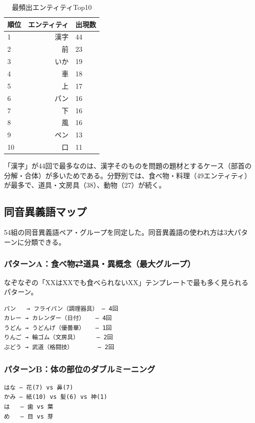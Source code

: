 \documentclass[a4paper,11pt]{ltjsarticle}
\begin{document}
\begin{table}[htbp]
\caption{最頻出エンティティTop10}
\centering
\begin{tabular}{lrl}
\toprule
順位 & エンティティ & 出現数\\
\midrule
1 & 漢字 & 44\\
2 & 前 & 23\\
3 & いか & 19\\
4 & 車 & 18\\
5 & 上 & 17\\
6 & パン & 16\\
7 & 下 & 16\\
8 & 風 & 16\\
9 & ペン & 13\\
10 & 口 & 11\\
\bottomrule
\end{tabular}
\end{table}

「漢字」が44回で最多なのは、漢字そのものを問題の題材とするケース（部首の分解・合体）が多いためである。分野別では、食べ物・料理（49エンティティ）が最多で、道具・文房具（38）、動物（27）が続く。

\subsection{同音異義語マップ}

54組の同音異義語ペア・グループを同定した。同音異義語の使われ方は3大パターンに分類できる。

\subsubsection*{パターンA：食べ物⇄道具・異概念（最大グループ）}

なぞなぞの「XXはXXでも食べられないXX」テンプレートで最も多く見られるパターン。

\begin{Verbatim}[frame=single,fontsize=\small]
パン   → フライパン（調理器具） — 4回
カレー → カレンダー（日付）   — 4回
うどん → うどんげ（優曇華）   — 1回
りんご → 輪ゴム（文房具）     — 2回
ぶどう → 武道（格闘技）       — 2回
\end{Verbatim}

\subsubsection*{パターンB：体の部位のダブルミーニング}

\begin{Verbatim}[frame=single,fontsize=\small]
はな — 花(7) vs 鼻(7)
かみ — 紙(10) vs 髪(6) vs 神(1)
は   — 歯 vs 葉
め   — 目 vs 芽
\end{Verbatim}
\end{document}
